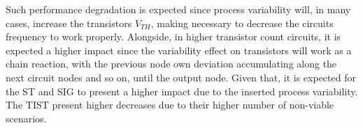 \documentclass[pgmicro,mestrado,english]{iiufrgs}
\begin{document}




Such performance degradation is expected since process variability will, in many cases, increase the transistors $V_{TH}$, making necessary to decrease the circuits frequency to work properly. Alongside, in higher transistor count circuits, it is expected a higher impact since the variability effect on transistors will work as a chain reaction, with the previous node own deviation accumulating along the next circuit nodes and so on, until the output node. Given that, it is expected for the ST and SIG to present a higher impact due to the inserted process variability. The TIST present higher decreases due to their higher number of non-viable scenarios.  %
    
\end{document}
